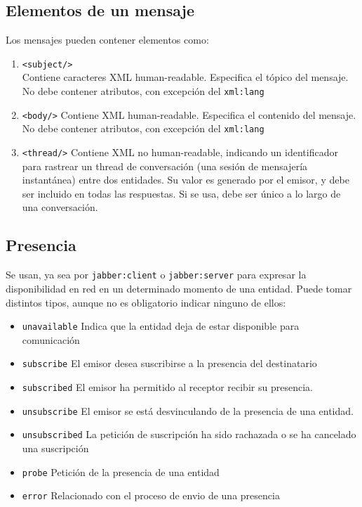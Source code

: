 \documentclass[a4paper, 11pt]{article} %
\begin{document}
  \subsection{Elementos de un mensaje}
    Los mensajes pueden contener elementos como:
    \begin{enumerate}
     \item \texttt{<subject/>}\\
     Contiene caracteres XML human-readable. Especifica el tópico del mensaje. No debe contener atributos, con excepción
     del \texttt{xml:lang}
     \item \texttt{<body/>}
     Contiene XML human-readable. Especifica el contenido del mensaje. No debe contener atributos, con excepción
     del \texttt{xml:lang}
     \item \texttt{<thread/>}
     Contiene XML no human-readable, indicando un identificador para rastrear un thread de conversación (una sesión de
     mensajería instantánea) entre dos entidades. Su valor es generado por el emisor, y debe ser incluido en todas 
     las respuestas. Si se usa, debe ser único a lo largo de una conversación.
    \end{enumerate}

  \subsection{Presencia}
    Se usan, ya sea por \texttt{jabber:client} o \texttt{jabber:server} para expresar la disponibilidad en red en un
    determinado momento de una entidad. Puede tomar distintos tipos, aunque no es obligatorio indicar ninguno de ellos:
    \begin{itemize}
     \item \texttt{unavailable} Indica que la entidad deja de estar disponible para comunicación
     \item \texttt{subscribe} El emisor desea suscribirse a la presencia del destinatario %
     \item \texttt{subscribed} El emisor ha permitido al receptor recibir su presencia.
     \item \texttt{unsubscribe} El emisor se está desvinculando de la presencia de una entidad.
     \item \texttt{unsubscribed} La petición de suscripción ha sido rachazada o se ha cancelado una suscripción
     \item \texttt{probe} Petición de la presencia de una entidad
     \item \texttt{error} Relacionado con el proceso de envio de una presencia
    \end{itemize}
    
\end{document}
